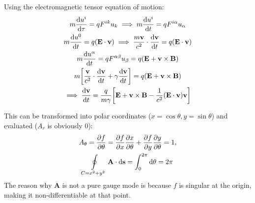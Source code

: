 \documentclass{report}
\theoremstyle{definition}
\begin{document}
\begin{chapter2}
	
\end{chapter2}

\begin{chapter2}
	Using the electromagnetic tensor equation of motion:
	\begin{gather*}
		m\dv{u^i}{\tau} = q F^{ik}u_k \implies m\dv{u^i}{t} = q F^{i\alpha}u_{\alpha} \\
		m\dv{u^0}{t} = q\pqty{\mathbf E \cdot \mathbf v} \implies \frac{m\mathbf v}{c^2}\cdot\dv{\mathbf v}{t} = q\pqty{\mathbf E \cdot \mathbf v} \\
		m\dv{u^{\alpha}}{t} = q F^{\alpha\beta}u_{\beta} = q\pqty{\mathbf E + \mathbf v \times \mathbf B} \\
		m\bqty{\frac{\mathbf v}{c^2}\cdot \dv{\mathbf v}{t} + \gamma \dv{\mathbf v}{t}} = q\pqty{\mathbf E + \mathbf v \times \mathbf B} \\
		\implies \dv{\mathbf v}{t} = \frac{q}{m\gamma}\bqty{\mathbf E + \mathbf v \times \mathbf B - \frac{1}{c^2}\pqty{\mathbf E \cdot \mathbf v}\mathbf v}
	\end{gather*}
\end{chapter2}

\begin{chapter2}
	This can be transformed into polar coordinates ($x = \cos\theta, y = \sin\theta $) and evaluated ($A_r$ is obviously 0):
	\begin{gather*}
		A_{\theta} = \pdv{f}{\theta} = \pdv{f}{x}\pdv{x}{\theta} + \pdv{f}{y}\pdv{y}{\theta} = 1,\\
		\oint\limits_{C = x^2 + y^2} \mathbf A \cdot \dd{\mathbf s} = \int_0^{2\pi}\dd{\theta} = 2\pi 
	\end{gather*}
	The reason why $\mathbf A$ is not a pure gauge mode is because $f$ is singular at the origin, making it non-differentiable at that point. 
\end{chapter2}

\begin{chapter2}
		
\end{chapter2}
\end{document}
